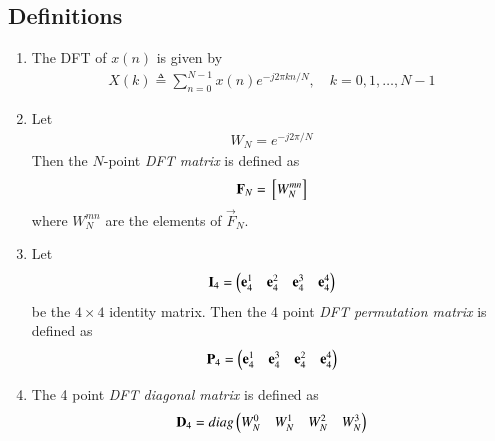 \documentclass[journal,12pt,twocolumn]{IEEEtran}
\renewcommand\thesection{\arabic{section}}
\begin{document}
 \subsection{Definitions}
\begin{enumerate}[label=\arabic*.,ref=\thesection.\theenumi]
    \item The DFT of $x(n)$ is given by
    \begin{align}
        X(k) \triangleq \sum_{n=0}^{N-1} x(n) e^{-j 2 \pi k n / N}, \quad k=0,1, \ldots, N-1
    \end{align}
\item Let 
	\begin{align}
W_{N} = e^{-j2\pi/N} 
	\end{align}
		Then the $N$-point {\em DFT matrix} is defined as 
	\begin{align}
		\mathbf{F}_{N} = {}\left[W_{N}^{mn}\right]
	\end{align}
	where $W_{N}^{mn}$ are the elements of $\vec{F}_{N}$.
\item Let 
	\begin{align}
		\mathbf{I}_4 = \begin{pmatrix}\mathbf{e}_4^{1} &\mathbf{e}_4^{2} &\mathbf{e}_4^{3} &\mathbf{e}_4^{4} \end{pmatrix}
	\end{align}
		be the $4\times 4$ identity matrix.  Then the 4 point {\em DFT permutation matrix} is defined as 
	\begin{align}
		\mathbf{P}_4 = \begin{pmatrix}\mathbf{e}_4^{1} &\mathbf{e}_4^{3} &\mathbf{e}_4^{2} &\mathbf{e}_4^{4} \end{pmatrix}
	\end{align}
\item The 4 point {\em DFT diagonal matrix} is defined as 
	\begin{align}
		\mathbf{D}_4 = diag\begin{pmatrix}W_{N}^{0} & W_{N}^{1} & W_{N}^{2} & W_{N}^{3}\end{pmatrix}
	\end{align}
 \end{enumerate}
\end{document}
